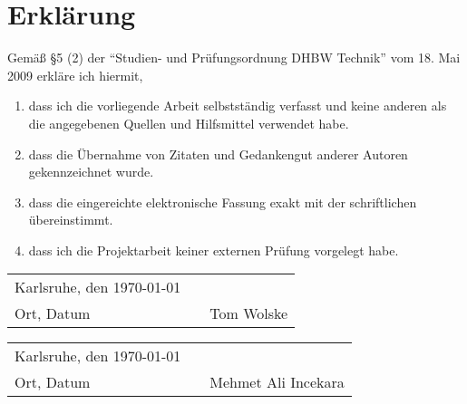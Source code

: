 
\section*{Erklärung}
\vspace*{2em}

Gemäß \S 5 (2) der \enquote{Studien- und Prüfungsordnung DHBW Technik} vom 18. Mai 2009 erkläre ich hiermit,
\begin{enumerate}
\item dass ich die vorliegende Arbeit selbstständig verfasst und keine anderen als die
angegebenen Quellen und Hilfsmittel verwendet habe. 
\item dass die Übernahme von Zitaten und Gedankengut anderer Autoren gekennzeichnet wurde.
\item dass die eingereichte elektronische Fassung exakt mit der schriftlichen übereinstimmt.
\item dass ich die Projektarbeit keiner externen Prüfung vorgelegt habe.
\end{enumerate}

\vspace{3em}

\begin{tabular}{lp{2em}l}
 Karlsruhe, den \today  && \hspace{7cm} \\\cline{1-1}\cline{3-3}
 Ort, Datum     &&  Tom Wolske
\end{tabular} 

\begin{tabular}{lp{2em}l}
 Karlsruhe, den \today  && \hspace{7cm} \\\cline{1-1}\cline{3-3}
 Ort, Datum     &&  Mehmet Ali Incekara
\end{tabular} 
